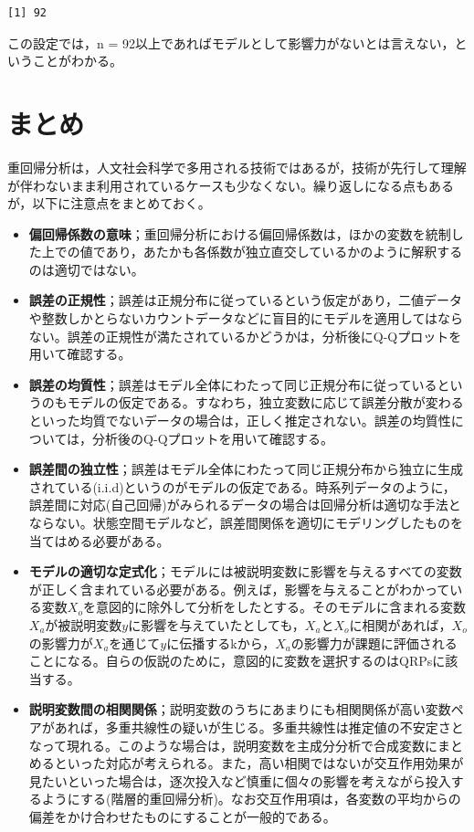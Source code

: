 \documentclass[
  a4paper,
]{ltjsbook}
\providecommand{\tightlist}{%
  \setlength{\itemsep}{0pt}\setlength{\parskip}{0pt}}
\begin{document}
\begin{verbatim}
[1] 92
\end{verbatim}

この設定では，n =
92以上であればモデルとして影響力がないとは言えない，ということがわかる。

\section{まとめ}\label{ux307eux3068ux3081}

重回帰分析は，人文社会科学で多用される技術ではあるが，技術が先行して理解が伴わないまま利用されているケースも少なくない。繰り返しになる点もあるが，以下に注意点をまとめておく。

\begin{itemize}
\tightlist
\item
  \textbf{偏回帰係数の意味}；重回帰分析における偏回帰係数は，ほかの変数を統制した上での値であり，あたかも各係数が独立直交しているかのように解釈するのは適切ではない。
\item
  \textbf{誤差の正規性}；誤差は正規分布に従っているという仮定があり，二値データや整数しかとらないカウントデータなどに盲目的にモデルを適用してはならない。誤差の正規性が満たされているかどうかは，分析後にQ-Qプロットを用いて確認する。
\item
  \textbf{誤差の均質性}；誤差はモデル全体にわたって同じ正規分布に従っているというのもモデルの仮定である。すなわち，独立変数に応じて誤差分散が変わるといった均質でないデータの場合は，正しく推定されない。誤差の均質性については，分析後のQ-Qプロットを用いて確認する。
\item
  \textbf{誤差間の独立性}；誤差はモデル全体にわたって同じ正規分布から独立に生成されている(i.i.d)というのがモデルの仮定である。時系列データのように，誤差間に対応(自己回帰)がみられるデータの場合は回帰分析は適切な手法とならない。状態空間モデルなど，誤差間関係を適切にモデリングしたものを当てはめる必要がある。
\item
  \textbf{モデルの適切な定式化}；モデルには被説明変数に影響を与えるすべての変数が正しく含まれている必要がある。例えば，影響を与えることがわかっている変数\(X_o\)を意図的に除外して分析をしたとする。そのモデルに含まれる変数\(X_a\)が被説明変数\(y\)に影響を与えていたとしても，\(X_a\)と\(X_o\)に相関があれば，\(X_o\)の影響力が\(X_a\)を通じて\(y\)に伝播するkから，\(X_a\)の影響力が課題に評価されることになる。自らの仮説のために，意図的に変数を選択するのはQRPsに該当する。
\item
  \textbf{説明変数間の相関関係}；説明変数のうちにあまりにも相関関係が高い変数ペアがあれば，多重共線性の疑いが生じる。多重共線性は推定値の不安定さとなって現れる。このような場合は，説明変数を主成分分析で合成変数にまとめるといった対応が考えられる。また，高い相関ではないが交互作用効果が見たいといった場合は，逐次投入など慎重に個々の影響を考えながら投入するようにする(階層的重回帰分析)。なお交互作用項は，各変数の平均からの偏差をかけ合わせたものにすることが一般的である。
\end{itemize}
\end{document}
